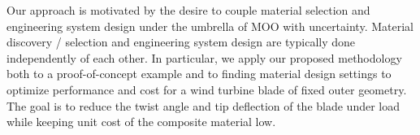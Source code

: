\documentclass[twocolumn,10pt]{asme2ej}
\begin{document}
%

%
%

%
Our approach is motivated by the desire to couple material selection and engineering system design under the umbrella of MOO with uncertainty. Material discovery / selection and engineering system design are typically done independently of each other. In particular, we apply our proposed methodology both to a proof-of-concept example and to finding material design settings to optimize performance and cost for a wind turbine blade of fixed outer geometry. The goal is to reduce the twist angle and tip deflection of the blade under load while keeping unit cost of the composite material low.

%

%
%
\end{document}

